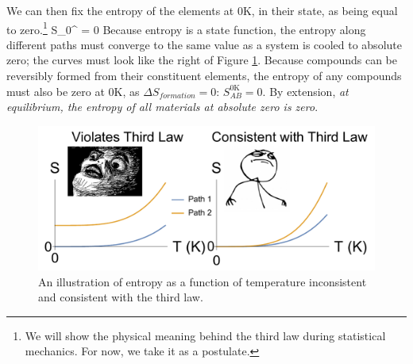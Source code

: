 \documentclass[12pt]{article}
\begin{document}
We can then fix the entropy of the elements at 0K, in their  state, as being equal to zero.\footnote{We will show the physical meaning behind the third law during statistical mechanics. For now, we take it as a postulate.} \beq S_{0}^ = 0 \ceq
Because entropy is a state function, the entropy along different paths must converge to the same value as a system is cooled to absolute zero; the curves must look like the right of Figure \ref{ThirdLawConsistency}. Because compounds can be reversibly formed from their constituent elements, the entropy of any compounds must also be zero at 0K, as $\Delta S_{formation}=0$: $S_{AB}^\text{0K} = 0$. By extension, \emph{at equilibrium, the entropy of all materials at absolute zero is zero}. 
\begin{figure}[h]
\label{ThirdLawConsistency}
\centering
\includegraphics[width = 12cm]{thirdLawPlot_with_faces.pdf}
\caption{An illustration of entropy as a function of temperature inconsistent and consistent with the third law.}
\end{figure}



\end{document}
